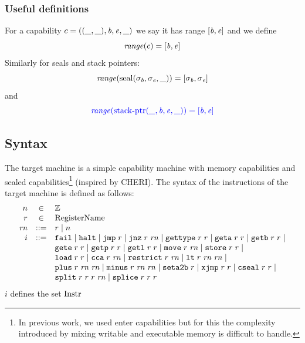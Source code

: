 \documentclass[a4paper]{article}
\begin{document}
\subsubsection{Useful definitions}
\begin{definition}
  For a capability $c=((\_,\_),\mathit{b},\mathit{e},\_)$ we say it has range $[\mathit{b},\mathit{e}]$ and we define
  \[
    \range{c} = [\baddr,\eaddr]
  \]
  Similarly for seals and stack pointers:
  \[
    \range{\seal{\sigma_\baddr,\sigma_\eaddr,\_}} = [\sigma_\baddr,\sigma_\eaddr]
  \]
  and
  \[
    \src{\range{\stkptr{\_,\baddr,\eaddr,\_}} = [\baddr,\eaddr]}
  \]
\end{definition}

\subsection{Syntax}
\label{sec:syntax}
The target machine is a simple capability machine with memory capabilities and sealed capabilities\footnote{In previous work, we used enter capabilities but for this the complexity introduced by mixing writable and executable memory is difficult to handle.} (inspired by CHERI). The syntax of the instructions of the target machine is defined as follows:
\[
\begin{array}{rcl}
n &\in & \ints \\
\com{r} &\in &  \tRegName \\
\com{\rn} &\defbnf &  \com{r} \mid n \\
\com{i} &\defbnf & \tfail \mid \thalt \mid \tjmp{\com{r}} \mid \tjnz{\com{r}}{\com{\rn}} \mid \tisptr{\com{r}}{\com{r}} \mid \tgeta{\com{r}}{\com{r}} \mid \tgetb{\com{r}}{\com{r}} \mid \\
      & &  \tgete{\com{r}}{\com{r}}\mid \tgetp{\com{r}}{\com{r}} \mid \tgetlin{\com{r}}{\com{r}} \mid \tmove{\com{r}}{\com{\rn}} \mid \tstore{\com{r}}{\com{r}} \mid\\
      & &  \tload{\com{r}}{\com{r}} \mid \tcca{\com{r}}{\com{\rn}} \mid \trestrict{\com{r}}{\com{\rn}} \mid \tlt{\com{r}}{\com{\rn}}{\com{\rn}} \mid \\
  & & \tplus{\com{r}}{\com{\rn}}{\com{\rn}} \mid \tminus{\com{r}}{\com{\rn}}{\com{\rn}} \mid \tsetatob{\com{r}} \mid \txjmp{\com{r}}{\com{r}} \mid \tcseal{\com{r}}{\com{r}} \mid \\ 
      & &   \tsplit{\com{r}}{\com{r}}{\com{r}}{\com{\rn}} \mid\tsplice{\com{r}}{\com{r}}{\com{r}} 
\end{array}
\]
$i$ defines the set $\mathrm{Instr}$
\end{document}
